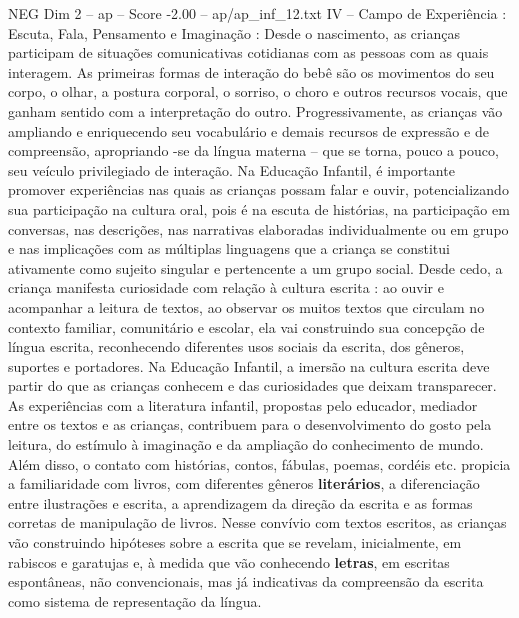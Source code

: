 \begin{textsample}{NEG Dim 2 – ap – Score -2.00 – ap/ap\_inf\_12.txt}  \label{ex:f2_neg_142}
IV – Campo de Experiência : Escuta, Fala, Pensamento e Imaginação : Desde o nascimento, as crianças participam de situações comunicativas cotidianas com as pessoas com as quais interagem.
As primeiras formas de interação do bebê são os movimentos do seu corpo, o olhar, a postura corporal, o sorriso, o choro e outros recursos vocais, que ganham sentido com a interpretação do outro.
Progressivamente, as crianças vão ampliando e enriquecendo seu vocabulário e demais recursos de expressão e de compreensão, apropriando -se da língua materna – que se torna, pouco a pouco, seu veículo privilegiado de interação.
Na Educação Infantil, é importante promover experiências nas quais as crianças possam falar e ouvir, potencializando sua participação na cultura oral, pois é na escuta de histórias, na participação em conversas, nas descrições, nas narrativas elaboradas individualmente ou em grupo e nas implicações com as múltiplas linguagens que a criança se constitui ativamente como sujeito singular e pertencente a um grupo social.
Desde cedo, a criança manifesta curiosidade com relação à cultura escrita : ao ouvir e acompanhar a leitura de textos, ao observar os muitos textos que circulam no contexto familiar, comunitário e escolar, ela vai construindo sua concepção de língua escrita, reconhecendo diferentes usos sociais da escrita, dos gêneros, suportes e portadores.
Na Educação Infantil, a imersão na cultura escrita deve partir do que as crianças conhecem e das curiosidades que deixam transparecer.
As experiências com a literatura infantil, propostas pelo educador, mediador entre os textos e as crianças, contribuem para o desenvolvimento do gosto pela leitura, do estímulo à imaginação e da ampliação do conhecimento de mundo.
Além disso, o contato com histórias, contos, fábulas, poemas, cordéis etc. propicia a familiaridade com livros, com diferentes gêneros \textbf{literários}, a diferenciação entre ilustrações e escrita, a aprendizagem da direção da escrita e as formas corretas de manipulação de livros.
Nesse convívio com textos escritos, as crianças vão construindo hipóteses sobre a escrita que se revelam, inicialmente, em rabiscos e garatujas e, à medida que vão conhecendo \textbf{letras}, em escritas espontâneas, não convencionais, mas já indicativas da compreensão da escrita como sistema de representação da língua.

\end{textsample}

